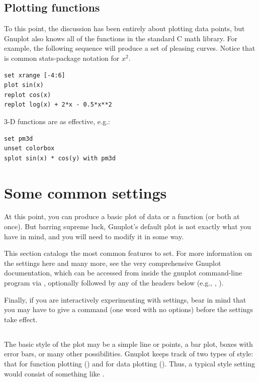 \subsection{Plotting functions} To this point, the discussion has been
entirely about plotting data points, but Gnuplot also knows all of the
functions in the standard C math library. For example, the following
sequence will produce a set of pleasing curves. Notice that 
is common stats-package notation for $x^2$.  
\begin{lstlisting}
set xrange [-4:6]
plot sin(x)
replot cos(x)
replot log(x) + 2*x - 0.5*x**2
\end{lstlisting}

3-D functions are as effective, e.g.:
\begin{lstlisting}
set pm3d
unset colorbox
splot sin(x) * cos(y) with pm3d
\end{lstlisting}

\section{Some common settings}
At this point, you can produce a basic plot of data or a function (or
both at once). But barring supreme luck, Gnuplot's default plot is not
exactly what you have in mind, and you will need to modify it in some way.

This section catalogs the most common features to set.  
For more information on the settings here and many more, see the
very comprehensive Gnuplot documentation, which can be accessed from
inside the gnuplot command-line program via
, optionally followed by any of the headers below (e.g.,
, ).

Finally, if you are interactively experimenting with settings, bear in
mind that you may have to give a  command (one word with no
options) before the settings take effect.

\subsection{} The basic style of the plot may be a simple
line or points, a bar plot, boxes with error bars, or many other
possibilities. Gnuplot keeps track of two types of style: that for
function plotting () and for data plotting (). 
Thus, a typical style setting would consist of something like .

